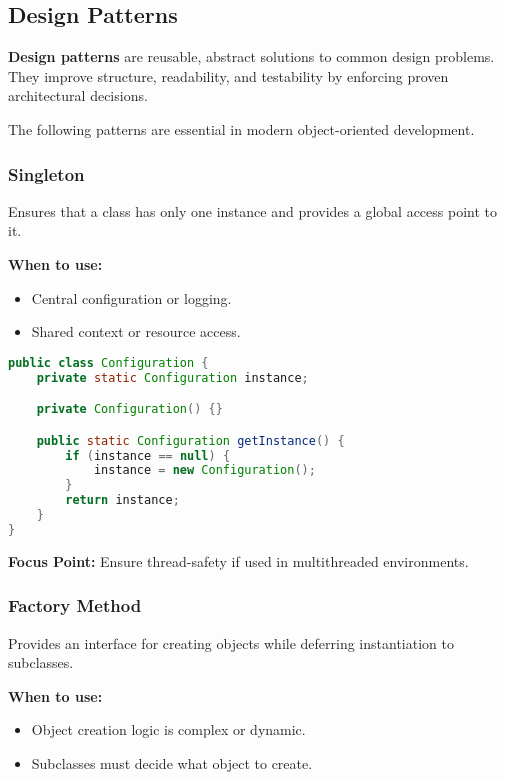 \documentclass[a4paper,12pt]{article}
\begin{document}
\subsection{Design Patterns}

\textbf{Design patterns} are reusable, abstract solutions to common design problems. They improve structure, readability, and testability by enforcing proven architectural decisions.

The following patterns are essential in modern object-oriented development.

\subsubsection{Singleton}

Ensures that a class has only one instance and provides a global access point to it.

\textbf{When to use:}
\begin{itemize}
  \item Central configuration or logging.
  \item Shared context or resource access.
\end{itemize}

\begin{lstlisting}[language=Java]
public class Configuration {
    private static Configuration instance;

    private Configuration() {}

    public static Configuration getInstance() {
        if (instance == null) {
            instance = new Configuration();
        }
        return instance;
    }
}
\end{lstlisting}

\textbf{Focus Point:} Ensure thread-safety if used in multithreaded environments.

\subsubsection{Factory Method}

Provides an interface for creating objects while deferring instantiation to subclasses.

\textbf{When to use:}
\begin{itemize}
  \item Object creation logic is complex or dynamic.
  \item Subclasses must decide what object to create.
\end{itemize}
\end{document}
